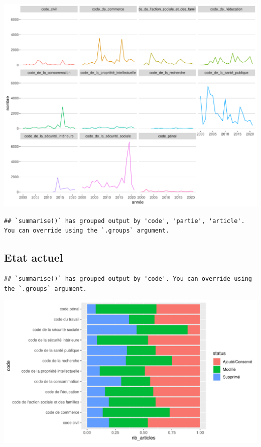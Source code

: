 \documentclass[
  oneside]{book}
\begin{document}
\includegraphics{05-images_files/figure-latex/unnamed-chunk-2-1.pdf}

\begin{verbatim}
## `summarise()` has grouped output by 'code', 'partie', 'article'. You can override using the `.groups` argument.
\end{verbatim}

\hypertarget{etat-actuel}{%
\subsection{Etat actuel}\label{etat-actuel}}

\begin{verbatim}
## `summarise()` has grouped output by 'code'. You can override using the `.groups` argument.
\end{verbatim}

\includegraphics{05-images_files/figure-latex/modif.glob.plot1-1.pdf}
\end{document}
